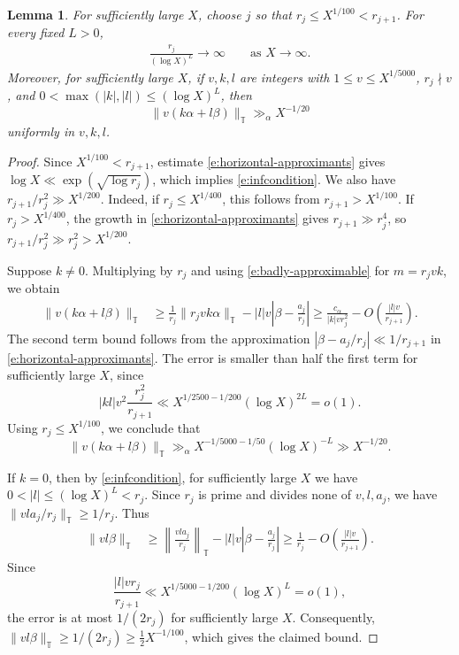 \documentclass[12pt]{amsart}
\newcommand{\1}{\mathbf 1}
\newtheorem{lemma}[theorem]{Lemma}
\theoremstyle{definition}
\begin{document}
\begin{lemma}\label{l:heisenberg-horizontal}
For sufficiently large \(X\), choose \(j\) so that
\(r_j\leq X^{1/100}<r_{j+1}\). For every fixed \(L>0\),
\begin{align}\label{e:infcondition}
    \frac{r_j}{(\log X)^L}\longrightarrow\infty
 \qquad\text{as }X\to\infty.
\end{align}
Moreover, for sufficiently large \(X\), if \(v,k,l\) are integers
with \(1\leq v\leq X^{1/5000}\), \(r_j\nmid v\), and
\(0<\max(|k|,|l|)\leq(\log X)^L\), then
\[
 \|v(k\alpha+l\beta)\|_{\mathbb T}\gg_\alpha X^{-1/20}
\]
uniformly in \(v,k,l\).
\end{lemma}

\begin{proof}
Since \(X^{1/100}<r_{j+1}\), estimate \eqref{e:horizontal-approximants}
gives \(\log X\ll\exp(\sqrt{\log r_j})\), which implies  \eqref{e:infcondition}.
We also have $r_{j+1}/{r_j^2}\gg X^{1/200}.$
Indeed, if \(r_j\leq X^{1/400}\), this follows from
\(r_{j+1}>X^{1/100}\). If \(r_j>X^{1/400}\), the growth in
\eqref{e:horizontal-approximants} gives \(r_{j+1}\gg r_j^4\),
so \(r_{j+1}/r_j^2\gg r_j^2>X^{1/200}\).

Suppose \(k\ne0\). Multiplying by \(r_j\) and using
\eqref{e:badly-approximable} for $m=r_j v k$, we obtain
\[
\begin{aligned}
 \|v(k\alpha+l\beta)\|_{\mathbb T}
 &\geq \frac1{r_j}\|r_jvk\alpha\|_{\mathbb T}
       -|l|v\left|\beta-\frac{a_j}{r_j}\right|\geq \frac{c_\alpha}{|k|v r_j^2}
       -O\left(\frac{|l|v}{r_{j+1}}\right).
\end{aligned}
\]
The second term bound follows from the approximation
\(\left|\beta-a_j/r_j\right|\ll 1/r_{j+1}\) in
\eqref{e:horizontal-approximants}. The error is smaller than half the first term for sufficiently
large \(X\), since
\[
 |kl|v^2\frac{r_j^2}{r_{j+1}}
 \ll X^{1/2500-1/200}(\log X)^{2L}=o(1).
\]
Using \(r_j\leq X^{1/100}\), we conclude that
\[
 \|v(k\alpha+l\beta)\|_{\mathbb T}
 \gg_\alpha X^{-1/5000-1/50}(\log X)^{-L}
 \gg X^{-1/20}.
\]

If \(k=0\), then by \eqref{e:infcondition}, for sufficiently large
\(X\) we have \(0<|l|\leq(\log X)^L<r_j\). Since \(r_j\) is prime
and divides none of \(v,l,a_j\), we have
\(\|vla_j/r_j\|_{\mathbb T}\geq 1/r_j\). Thus
\[
\begin{aligned}
 \|vl\beta\|_{\mathbb T}
 &\geq \left\|\frac{vla_j}{r_j}\right\|_{\mathbb T}
       -|l|v\left|\beta-\frac{a_j}{r_j}\right|\geq \frac1{r_j}-O\left(\frac{|l|v}{r_{j+1}}\right).
\end{aligned}
\]
Since
\[
 \frac{|l|v r_j}{r_{j+1}}
 \ll X^{1/5000-1/200}(\log X)^L=o(1),
\]
the error is at most \(1/(2r_j)\) for sufficiently large \(X\).
Consequently, \(\|vl\beta\|_{\mathbb T}\geq 1/(2r_j)
\geq \tfrac12 X^{-1/100}\), which gives the claimed bound.
\end{proof}
\end{document}
